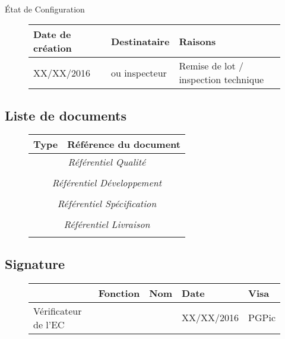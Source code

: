 \documentclass[asi, sansVersion]{picInsa}
\begin{document}
\begin{center}
\huge
\nomEquipe{}\\
État de Configuration\\
\end{center}
\vspace{0.5cm}


\begin{figure}[H]
		\centering
		\begin{tabularx}{17cm}{|p{4cm}|X|X|}
		\hline
		\rowcolor[gray]{0.85}Date de création & Destinataire & Raisons \\
		\hline
		XX/XX/2016 & \nomClient{} ou inspecteur & Remise de lot / inspection technique \\
		\hline
		\end{tabularx}
\end{figure}

\subsection*{Liste de documents}

\begin{figure}[H]
		\centering
		\begin{tabularx}{17cm}{|p{7cm}|X|}
		\hline
		\rowcolor[gray]{0.85}Type & Référence du document\\
		\hline
		\multicolumn{2}{|c|}{\textit{Référentiel Qualité}}\\
		\hline
		& \\
		\hline
		\multicolumn{2}{|c|}{\textit{Référentiel Développement}}\\
		\hline 
		 &   \\
		\hline 
		\multicolumn{2}{|c|}{\textit{Référentiel Spécification}}\\
		\hline
		& \\
		\hline 
		\multicolumn{2}{|c|}{\textit{Référentiel Livraison}}\\
		\hline
		& \\
		\hline 
		\end{tabularx}
\end{figure}

\subsection*{Signature}

\begin{figure}[H]
		\centering
		\begin{tabularx}{17cm}{|p{4cm}|X|X|X|X|}
		\hline
		\rowcolor[gray]{0.85}& Fonction & Nom & Date & Visa \\
		\hline
		 Vérificateur de l'EC & \RGC & \Mathieu & XX/XX/2016 & PGPic \\
		\hline
		\end{tabularx}
\end{figure}
\end{document}
